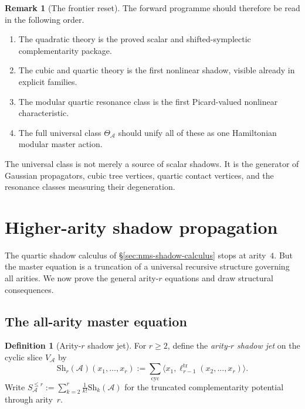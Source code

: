\documentclass[11pt,oneside]{memoir}
\numberwithin{equation}{chapter}
\theoremstyle{definition}
\newtheorem{definition}[theorem]{Definition}
\newtheorem{remark}[theorem]{Remark}
\newcommand{\cA}{\mathcal A}
\begin{document}
\begin{remark}[The frontier reset]
\label{rem:nms-frontier-reset}
The forward programme should therefore be read in the following order.
\begin{enumerate}[label=\textup{(\roman*)}]
\item The quadratic theory is the proved scalar and shifted-symplectic complementarity package.
\item The cubic and quartic theory is the first nonlinear shadow, visible already in explicit families.
\item The modular quartic resonance class is the first Picard-valued nonlinear characteristic.
\item The full universal class $\Theta_{\cA}$ should unify all of these as one Hamiltonian modular master action.
\end{enumerate}
The universal class is not merely a source of scalar shadows.  It is the generator of Gaussian propagators, cubic tree vertices, quartic contact vertices, and the resonance classes measuring their degeneration.
\end{remark}

\section{Higher-arity shadow propagation}
\label{sec:nms-higher-arity-propagation}

The quartic shadow calculus of \S\ref{sec:nms-shadow-calculus} stops at arity~$4$.  But the master equation is a truncation of a universal recursive structure governing all arities.  We now prove the general arity-$r$ equations and draw structural consequences.

\subsection{The all-arity master equation}
\label{subsec:nms-all-arity-master-equation}

\begin{definition}[Arity-$r$ shadow jet]
\label{def:nms-arity-r-shadow-jet}
For $r\ge 2$, define the \emph{arity-$r$ shadow jet} on the cyclic slice $V_{\cA}$ by
\begin{equation}
\label{eq:nms-arity-r-shadow-jet}
\mathrm{Sh}_r(\cA)(x_1,\dots,x_r)
:=
\sum_{\mathrm{cyc}}\langle x_1,\ell_{r-1}^{\mathrm{tr}}(x_2,\dots,x_r)\rangle.
\end{equation}
Write $S_{\cA}^{\le r}:=\sum_{k=2}^r \frac{1}{k!}\mathrm{Sh}_k(\cA)$ for the truncated complementarity potential through arity~$r$.
\end{definition}
\end{document}

